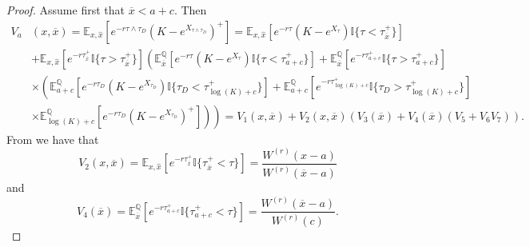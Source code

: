 \documentclass[10pt]{amsart}
\def\E{{\mathbb{E}}}
\def\Eq{{\mathbb{E}
		_{x,\hat{x}}}}
\def\Q{{\mathbb{Q}}}
\def \R{{{\rm I{\!}\rm R}}}
\def \I{{\mathbb{I}}}
\def\E{{\mathbb E}} \def\PP{\mc P} \def\Z{{\mathbb Z}} \def\R{{\mathbb R}}
\begin{document}
	\begin{proof}
		Assume first that $\overline{x} < a+c$. Then
		\begin{align*}
			V_a&(x,\overline{x}) = \Eq \left[ e^{-r\tau\wedge\tau_D} \left( K - e^{X_{\tau\wedge\tau_D}} \right)^+ \right] =  \Eq\left[ e^{-r\tau} \left( K - e^{X_\tau} \right) \I
			\{ \tau < \tau_{\overline{x}}^+ \} \right]  \\
			\nonumber & +  \Eq\left[ e^{-r\tau_{\overline{x}}^+} \I
			\{ \tau > \tau_{\overline{x}}^+ \} \right]\left( \E^\Q_{\overline{x}}\left[ e^{-r\tau} \left( K - e^{X_\tau} \right) \I
			\{ \tau < \tau_{a+c}^+ \} \right] + \E^\Q_{\overline{x}}\left[ e^{-r\tau_{a+c}^+} \I
			\{ \tau > \tau_{a+c}^+ \} \right]  \right. \\
			\nonumber &  \times \left(
			\E^\Q_{a+c}\left[ e^{-r\tau_D} \left( K - e^{X_{\tau_D}} \right) \I
			\{ \tau_D < \tau_{\log(K)+c}^+ \} \right] +
			\E^\Q_{a+c}\left[ e^{-r\tau_{\log(K)+c}^+}  \I
			\{ \tau_D > \tau_{\log(K)+c}^+ \} \right] \right. \\
			\nonumber & \times \left. \left.
			\E^\Q_{\log(K)+c}\left[ e^{-r\tau_D} \left( K - e^{X_{\tau_D}} \right)^+ \right]
			\right) \right) = V_1(x,\overline{x}) + V_2(x,\overline{x}) ( V_3(\overline{x}) +  V_4(\overline{x})(  V_5 + V_6 V_7  )   ).
		\end{align*}	
			From \cite[eq. (2.3)]{MP} we have that
			\begin{equation}\label{V2}
				V_2(x, \overline{x}) = \Eq \left[ e^{-r\tau^+_{\overline{x}}} \I \{ \tau^+_{\overline{x}} < \tau \} \right] = \frac{W^{(r)}(x-a)}{W^{(r)}(\overline{x}-a)}
			\end{equation}
			and
			\begin{equation}\label{V4}
				V_4(\overline{x}) = \E^\Q_{\overline{x}} \left[ e^{-r\tau^+_{a+c}} \I\{ \tau^+_{a+c} < \tau \} \right] = \frac{W^{(r)}(\overline{x}-a)}{W^{(r)}(c)}.
			\end{equation}
			

\end{proof}
\end{document}
